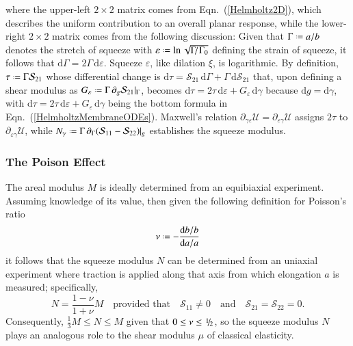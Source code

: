where the upper-left $2 \times 2$ matrix comes from Eqn.~(\ref{Helmholtz2D}), which describes the uniform contribution to an overall planar response, while the lower-right $2 \times 2$ matrix comes from the following discussion:  Given that $\Gamma \defeq a/b$ denotes the stretch of squeeze with $\varepsilon \defeq \ln \sqrt{\Gamma \! / \hspace{0.5pt} \Gamma_0}$ defining the strain of squeeze, it follows that $\mathrm{d} \Gamma = 2 \Gamma \, \mathrm{d} \varepsilon$.  Squeeze $\varepsilon$, like dilation $\xi$, is logarithmic.  By definition, $\tau \defeq \Gamma \mathcal{S}_{21}$ whose differential change is $\mathrm{d} \tau = \mathcal{S}_{21} \, \mathrm{d} \Gamma + \Gamma \, \mathrm{d} \mathcal{S}_{21}$ that, upon defining a shear modulus as $G_{\varepsilon} \defeq \Gamma \, \partial_g \mathcal{S}_{21} |_{\Gamma}$, becomes $\mathrm{d} \tau = 2 \tau \, \mathrm{d} \varepsilon + G_{\varepsilon} \, \mathrm{d} \gamma$ because $\mathrm{d} g = \mathrm{d} \gamma$, with $\mathrm{d} \tau = 2 \tau \, \mathrm{d} \varepsilon + G_{\varepsilon} \, \mathrm{d} \gamma$ being the bottom formula in Eqn.~(\ref{HelmholtzMembraneODEs}).  Maxwell's relation $\partial_{\gamma\varepsilon} \mathcal{U} = \partial_{\varepsilon\gamma} \mathcal{U}$ assigns $2 \tau$ to $\partial_{\varepsilon\gamma} \mathcal{U}$, while $N_{\gamma} \defeq \Gamma \, \partial_{\Gamma} ( \mathcal{S}_{11} - \mathcal{S}_{22} ) |_g$ establishes the squeeze modulus.

\subsubsection{The Poison Effect}

The areal modulus $M$ is ideally determined from an equibiaxial experiment.  Assuming knowledge of its value, then given the following definition for Poisson's ratio
\begin{displaymath}
\nu \defeq - \frac{\mathrm{d}b / b}{\mathrm{d}a / a}
\end{displaymath}
it follows that the squeeze modulus $N$ can be determined from an uniaxial experiment where traction is applied along that axis from which elongation $a$ is measured; specifically,
\begin{displaymath}
N = \frac{1 - \nu}{1 + \nu} M
\quad \text{provided that} \quad
\mathcal{S}_{11} \neq 0 
\quad \text{and} \quad
\mathcal{S}_{21} = \mathcal{S}_{22} = 0 .
\end{displaymath}
Consequently, $\tfrac{1}{3} M \leq N \leq M$ given that $0 \leq \nu \leq \textfrac{1}{2}$, so the squeeze modulus $N$ plays an analogous role to the shear modulus $\mu$ of classical elasticity.  


